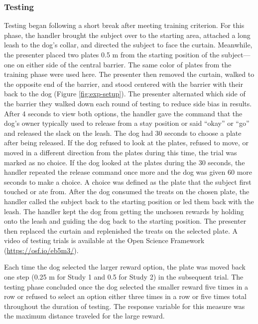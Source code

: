 \documentclass[
  pub,floatsintext]{apa6}
\begin{document}
\hypertarget{testing}{%
\subsubsection{Testing}\label{testing}}

Testing began following a short break after meeting training criterion. For this phase, the handler brought the subject over to the starting area, attached a long leash to the dog's collar, and directed the subject to face the curtain. Meanwhile, the presenter placed two plates 0.5 m from the starting position of the subject---one on either side of the central barrier. The same color of plates from the training phase were used here. The presenter then removed the curtain, walked to the opposite end of the barrier, and stood centered with the barrier with their back to the dog (Figure \ref{fig:exp-setup}). The presenter alternated which side of the barrier they walked down each round of testing to reduce side bias in results. After 4 seconds to view both options, the handler gave the command that the dog's owner typically used to release from a stay position or said ``okay'' or ``go'' and released the slack on the leash. The dog had 30 seconds to choose a plate after being released. If the dog refused to look at the plates, refused to move, or moved in a different direction from the plates during this time, the trial was marked as no choice. If the dog looked at the plates during the 30 seconds, the handler repeated the release command once more and the dog was given 60 more seconds to make a choice. A choice was defined as the plate that the subject first touched or ate from. After the dog consumed the treats on the chosen plate, the handler called the subject back to the starting position or led them back with the leash. The handler kept the dog from getting the unchosen rewards by holding onto the leash and guiding the dog back to the starting position. The presenter then replaced the curtain and replenished the treats on the selected plate. A video of testing trials is available at the Open Science Framework (\url{https://osf.io/eb5m3/}).

Each time the dog selected the larger reward option, the plate was moved back one step (0.25 m for Study 1 and 0.5 for Study 2) in the subsequent trial. The testing phase concluded once the dog selected the smaller reward five times in a row or refused to select an option either three times in a row or five times total throughout the duration of testing. The response variable for this measure was the maximum distance traveled for the large reward.
\end{document}
